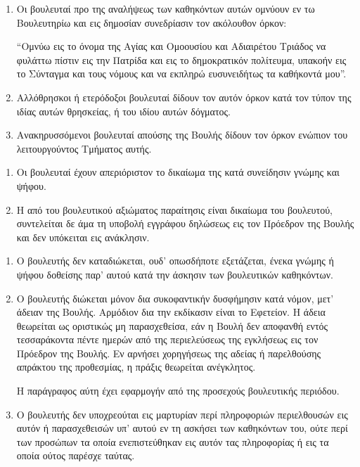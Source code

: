 \documentclass[twoside, a4paper, 10pt]{article}
\begin{document}
\begin{multicols}{2}
\begin{enumerate}
\begin{BigQuote}
\begin{enumerate}
  \item[1.] Οι βουλευταί προ της αναλήψεως των καθηκόντων αυτών ομνύουν εν τω Βουλευτηρίω και εις δημοσίαν συνεδρίασιν τον ακόλουθον όρκον:

“Ομνύω εις το όνομα της Αγίας και Ομοουσίου και Αδιαιρέτου Τριάδος να φυλάττω πίστιν εις την Πατρίδα και εις το δημοκρατικόν πολίτευμα, υπακοήν εις το Σύνταγμα και τους νόμους και να εκπληρώ ευσυνειδήτως τα καθήκοντά μου”.
  \item[2.] Αλλόθρησκοι ή ετερόδοξοι βουλευταί δίδουν τον αυτόν όρκον κατά τον τύπον της ιδίας αυτών θρησκείας, ή του ιδίου αυτών δόγματος.
  \item[3.] Ανακηρυσσόμενοι βουλευταί απούσης της Βουλής δίδουν τον όρκον ενώπιον του λειτουργούντος Τμήματος αυτής.
\end{enumerate}

\begin{enumerate}
  \item[1.] Οι βουλευταί  έχουν απεριόριστον  το δικαίωμα της κατά συνείδησιν γνώμης και ψήφου.
  \item[2.] Η από του βουλευτικού αξιώματος παραίτησις είναι δικαίωμα του βουλευτού, συντελείται δε άμα τη υποβολή εγγράφου δηλώσεως εις τον Πρόεδρον της Βουλής και δεν υπόκειται εις ανάκλησιν.
\end{enumerate}

\begin{enumerate}
  \item[1.] Ο βουλευτής δεν καταδιώκεται, ουδ' οπωσδήποτε εξετάζεται, ένεκα γνώμης ή ψήφου δοθείσης παρ' αυτού κατά την άσκησιν των βουλευτικών καθηκόντων.
  \item[2.] Ο βουλευτής διώκεται μόνον δια συκοφαντικήν δυσφήμησιν κατά νόμον, μετ' άδειαν της Βουλής. Αρμόδιον δια την εκδίκασιν είναι το Εφετείον. Η άδεια θεωρείται ως οριστικώς μη παρασχεθείσα, εάν η Βουλή δεν αποφανθή εντός τεσσαράκοντα πέντε ημερών από της περιελεύσεως της εγκλήσεως εις τον Πρόεδρον της Βουλής. Εν αρνήσει χορηγήσεως της αδείας ή παρελθούσης απράκτου της προθεσμίας, η πράξις θεωρείται ανέγκλητος.

Η παράγραφος αύτη έχει εφαρμογήν από της προσεχούς βουλευτικής περιόδου.
  \item[3.] Ο βουλευτής δεν υποχρεούται εις μαρτυρίαν περί πληροφοριών περιελθουσών εις αυτόν ή παρασχεθεισών υπ' αυτού εν τη ασκήσει των καθηκόντων του, ούτε περί των προσώπων τα οποία ενεπιστεύθηκαν εις αυτόν τας πληροφορίας ή εις τα οποία ούτος παρέσχε ταύτας.
\end{enumerate}


\end{BigQuote}
\end{enumerate}
\end{multicols}
\end{document}
